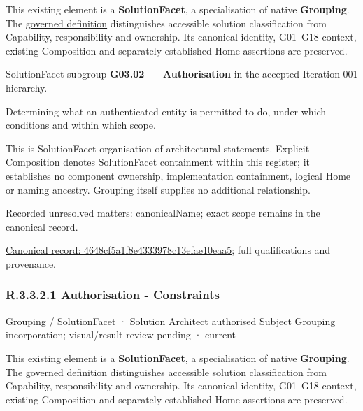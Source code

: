This existing element is a \textbf{SolutionFacet}, a specialisation of native
\textbf{Grouping}. The \href{\detokenize{../../../../../../../governance/continuum-representation.md#solutionfacet-classification--1119-candidate}}{governed definition}
distinguishes accessible solution classification from Capability, responsibility
and ownership. Its canonical identity, G01–G18 context, existing Composition
and separately established Home assertions are preserved.



SolutionFacet subgroup \textbf{G03.02 — Authorisation} in the accepted Iteration 001 hierarchy.



Determining what an authenticated entity is permitted to do, under which conditions and within which scope.



This is SolutionFacet organisation of architectural statements. Explicit Composition denotes SolutionFacet containment within this register; it establishes no component ownership, implementation containment, logical Home or naming ancestry. Grouping itself supplies no additional relationship.


{\small Recorded unresolved matters: canonicalName; exact scope remains in the canonical record.}\par
{\footnotesize \href{../../../../../../../continuum/grouping/4648cf5a1f8e4333978c13efae10eaa5.md}{Canonical record: 4648cf5a1f8e4333978c13efae10eaa5}; full qualifications and provenance.}\par
\subsubsection*{R.3.3.2.1 Authorisation - Constraints}
\label{navigation:R.3.3.2.1}

\label{element:c0ef85ab954f447fb244149dfcc44aad}
{\small Grouping / SolutionFacet · Solution Architect authorised Subject Grouping incorporation; visual/result review pending · current}\par

This existing element is a \textbf{SolutionFacet}, a specialisation of native
\textbf{Grouping}. The \href{\detokenize{../../../../../../../governance/continuum-representation.md#solutionfacet-classification--1119-candidate}}{governed definition}
distinguishes accessible solution classification from Capability, responsibility
and ownership. Its canonical identity, G01–G18 context, existing Composition
and separately established Home assertions are preserved.



